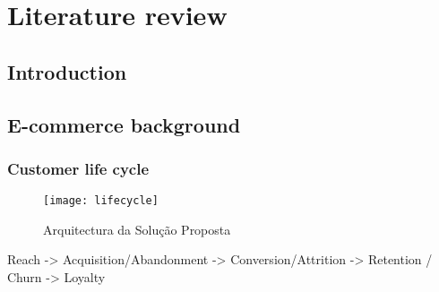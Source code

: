 \chapter{Literature review} \label{chap:sota}

\section*{}



\section{Introduction}



\section{E-commerce background}

\subsection{Customer life cycle}

\begin{figure}[t]
  \begin{center}
    \leavevmode
    \texttt{[image: lifecycle]}
    \caption{Arquitectura da Solução Proposta}
    \label{fig:lifecycle}
  \end{center}
\end{figure}

Reach -> Acquisition/Abandonment -> Conversion/Attrition -> Retention / Churn -> Loyalty

